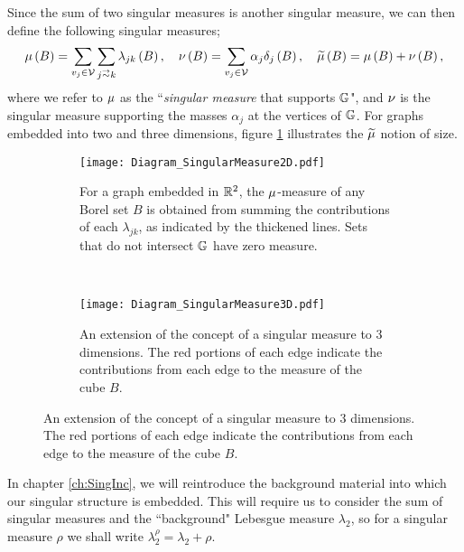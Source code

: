 Since the sum of two singular measures is another singular measure, we can then define the following singular measures;
\begin{align} \label{eq:Intro-MeasureDefs}
	\ddmes\bracs{B} = \sum_{v_j\in \vertSet}\sum_{j\conLeft k} \lambda_{jk}\bracs{B},
	\quad
	\massMes\bracs{B} = \sum_{v_j\in\vertSet}\alpha_j\delta_j\bracs{B},
	\quad
	\dddmes\bracs{B} = \ddmes\bracs{B} + \massMes\bracs{B},
\end{align}
where we refer to $\mu$ as the ``\emph{singular measure} that supports $\mathbb{G}$", and $\nu$ is the singular measure supporting the masses $\alpha_j$ at the vertices of $\mathbb{G}$.
For graphs embedded into two and three dimensions, figure \ref{fig:Diagram_SingularMeasure2D} illustrates the $\widetilde{\mu}$ notion of size.
\begin{figure}[b!]
	\centering
	\begin{subfigure}[t]{0.45\textwidth}
		\centering
		\texttt{[image: Diagram\_SingularMeasure2D.pdf]}
		\caption{\label{fig:Diagram_SingularMeasure2D} For a graph embedded in $\mathbb{R}^2$, the $\mu$-measure of any Borel set $B$ is obtained from summing the contributions of each $\lambda_{jk}$, as indicated by the thickened lines. Sets that do not intersect $\mathbb{G}$ have zero measure.}
	\end{subfigure}
	~
	\begin{subfigure}[t]{0.45\textwidth}
		\centering
		\texttt{[image: Diagram\_SingularMeasure3D.pdf]}
		\caption{\label{fig:Diagram_SingularMeasure3D} An extension of the concept of a singular measure to 3 dimensions. The red portions of each edge indicate the contributions from each edge to the measure of the cube $B$.}
	\end{subfigure}
\end{figure}
In chapter \ref{ch:SingInc}, we will reintroduce the background material into which our singular structure is embedded.
This will require us to consider the sum of singular measures and the ``background" Lebesgue measure $\lambda_2$, so for a singular measure $\rho$ we shall write $\lambda_2^{\rho} = \lambda_2 + \rho$.